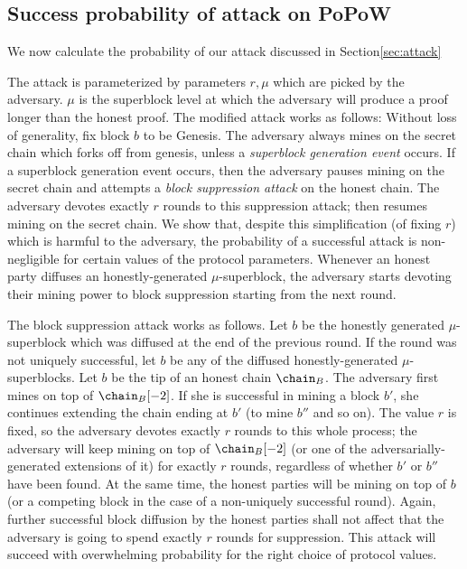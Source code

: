 \subsection{Success probability of attack on PoPoW}
\label{sec:attack-full}
We now calculate the probability of our attack discussed in Section\ref{sec:attack}

The attack is
parameterized by  parameters $r, \mu$ which are picked by the adversary. $\mu$
is the superblock level at which the adversary will produce a proof longer than
the honest proof. The modified attack works as follows: Without loss of
generality, fix block $b$ to be Genesis. The adversary always mines on the
secret chain which forks off from genesis, unless a \textit{superblock
generation event} occurs. If a superblock generation event occurs, then the
adversary pauses mining on the secret chain and attempts a \textit{block
suppression attack} on the honest chain. The adversary devotes exactly $r$
rounds to this suppression attack; then resumes mining on the secret chain. We
show that, despite this simplification (of fixing $r$) which is harmful to the
adversary, the probability of a successful attack is non-negligible for certain
values of the protocol parameters. 
%
Whenever an
honest party diffuses an honestly-generated $\mu$-superblock,
the adversary starts devoting their mining power to block suppression
starting from the next round.

The block suppression attack works as follows. Let $b$ be the honestly generated
$\mu$-superblock which was diffused at the end of the previous round. If the
round was not uniquely successful, let $b$ be any of the diffused
honestly-generated $\mu$-superblocks. Let $b$ be the tip of an honest chain
$\chain_B$. The adversary first mines on top of $\chain_B[-2]$. If she is
successful in mining a block $b'$, she continues extending the chain ending
at $b'$ (to mine $b''$ and so on). The value $r$ is fixed, so the adversary
devotes exactly $r$ rounds to this whole process; the adversary will keep mining
on top of $\chain_B[-2]$ (or one of the adversarially-generated extensions of
it) for exactly $r$ rounds, regardless of whether $b'$ or $b''$ have been found.
At the same time, the honest parties will be mining on top of $b$ (or a
competing block in the case of a non-uniquely successful round). Again, further
successful block diffusion by the honest parties shall not affect that the
adversary is going to spend exactly $r$ rounds for suppression.
This attack will succeed with overwhelming probability for the right choice
of protocol values.

